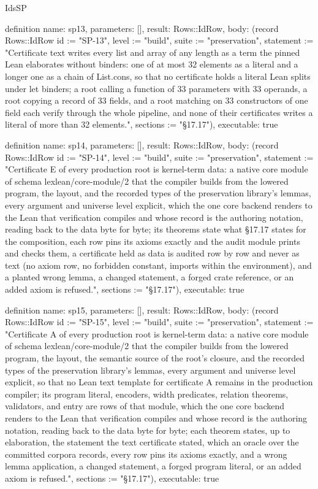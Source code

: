\begin{lexlean}{IdsSP}
\begin{semanticmodule}
definition{
  name: sp13,
  parameters: [],
  result: Rows::IdRow,
  body: (record Rows::IdRow {id := "SP-13", level := "build", suite := "preservation", statement := "Certificate text writes every list and array of any length as a term the pinned Lean elaborates without binders: one of at most 32 elements as a literal and a longer one as a chain of List.cons, so that no certificate holds a literal Lean splits under let binders; a root calling a function of 33 parameters with 33 operands, a root copying a record of 33 fields, and a root matching on 33 constructors of one field each verify through the whole pipeline, and none of their certificates writes a literal of more than 32 elements.", sections := "§17.17"}),
  executable: true
}

definition{
  name: sp14,
  parameters: [],
  result: Rows::IdRow,
  body: (record Rows::IdRow {id := "SP-14", level := "build", suite := "preservation", statement := "Certificate E of every production root is kernel-term data: a native core module of schema lexlean/core-module/2 that the compiler builds from the lowered program, the layout, and the recorded types of the preservation library's lemmas, every argument and universe level explicit, which the one core backend renders to the Lean that verification compiles and whose record is the authoring notation, reading back to the data byte for byte; its theorems state what §17.17 states for the composition, each row pins its axioms exactly and the audit module prints and checks them, a certificate held as data is audited row by row and never as text (no axiom row, no forbidden constant, imports within the environment), and a planted wrong lemma, a changed statement, a forged crate reference, or an added axiom is refused.", sections := "§17.17"}),
  executable: true
}

definition{
  name: sp15,
  parameters: [],
  result: Rows::IdRow,
  body: (record Rows::IdRow {id := "SP-15", level := "build", suite := "preservation", statement := "Certificate A of every production root is kernel-term data: a native core module of schema lexlean/core-module/2 that the compiler builds from the lowered program, the layout, the semantic source of the root's closure, and the recorded types of the preservation library's lemmas, every argument and universe level explicit, so that no Lean text template for certificate A remains in the production compiler; its program literal, encoders, width predicates, relation theorems, validators, and entry are rows of that module, which the one core backend renders to the Lean that verification compiles and whose record is the authoring notation, reading back to the data byte for byte; each theorem states, up to elaboration, the statement the text certificate stated, which an oracle over the committed corpora records, every row pins its axioms exactly, and a wrong lemma application, a changed statement, a forged program literal, or an added axiom is refused.", sections := "§17.17"}),
  executable: true
}


\end{semanticmodule}
\end{lexlean}
